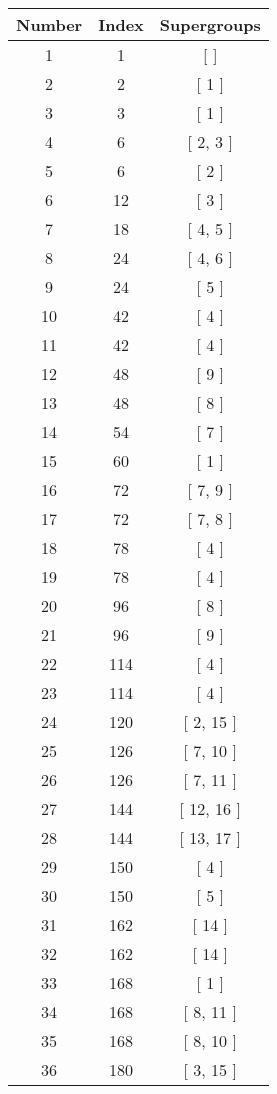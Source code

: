 \begin{center}
\begin{longtable}[H]{|| c c c ||}
\hline
Number &  Index &  Supergroups
\\\hline
1 & 1 & [  ]
\\\hline
2 & 2 & [ 1 ]
\\\hline
3 & 3 & [ 1 ]
\\\hline
4 & 6 & [ 2, 3 ]
\\\hline
5 & 6 & [ 2 ]
\\\hline
6 & 12 & [ 3 ]
\\\hline
7 & 18 & [ 4, 5 ]
\\\hline
8 & 24 & [ 4, 6 ]
\\\hline
9 & 24 & [ 5 ]
\\\hline
10 & 42 & [ 4 ]
\\\hline
11 & 42 & [ 4 ]
\\\hline
12 & 48 & [ 9 ]
\\\hline
13 & 48 & [ 8 ]
\\\hline
14 & 54 & [ 7 ]
\\\hline
15 & 60 & [ 1 ]
\\\hline
16 & 72 & [ 7, 9 ]
\\\hline
17 & 72 & [ 7, 8 ]
\\\hline
18 & 78 & [ 4 ]
\\\hline
19 & 78 & [ 4 ]
\\\hline
20 & 96 & [ 8 ]
\\\hline
21 & 96 & [ 9 ]
\\\hline
22 & 114 & [ 4 ]
\\\hline
23 & 114 & [ 4 ]
\\\hline
24 & 120 & [ 2, 15 ]
\\\hline
25 & 126 & [ 7, 10 ]
\\\hline
26 & 126 & [ 7, 11 ]
\\\hline
27 & 144 & [ 12, 16 ]
\\\hline
28 & 144 & [ 13, 17 ]
\\\hline
29 & 150 & [ 4 ]
\\\hline
30 & 150 & [ 5 ]
\\\hline
31 & 162 & [ 14 ]
\\\hline
32 & 162 & [ 14 ]
\\\hline
33 & 168 & [ 1 ]
\\\hline
34 & 168 & [ 8, 11 ]
\\\hline
35 & 168 & [ 8, 10 ]
\\\hline
36 & 180 & [ 3, 15 ]
\\\hline

\end{longtable}
\end{center}
